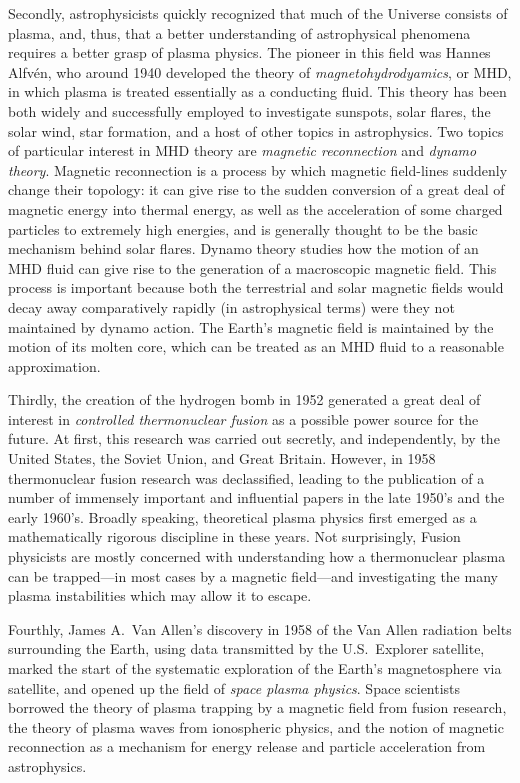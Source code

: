 Secondly, astrophysicists quickly 
recognized that much of the Universe consists of plasma,
and, thus, that a better understanding of astrophysical phenomena requires
a better grasp of plasma physics. The pioneer in this
field was Hannes Alfv\'{e}n, who around 1940 developed the theory of
{\em magnetohydrodyamics}, or MHD, in which plasma is treated essentially
 as a conducting
fluid. This theory has been both widely and successfully employed to
investigate sunspots, solar flares, the solar wind, star formation, and a
host of other topics in astrophysics. Two topics of particular
interest in MHD theory are {\em magnetic reconnection}\/ and
{\em dynamo theory}. Magnetic reconnection is a process by which magnetic field-lines
suddenly change their topology: it can give rise to the sudden
conversion of a great deal of magnetic energy into thermal energy, 
as well as the acceleration of some charged particles to extremely high energies,
and is
generally thought to be the basic  mechanism behind  solar flares. Dynamo theory
studies how the motion of an MHD fluid can give rise to the generation of
a macroscopic magnetic field. This process is important because
both the terrestrial and solar magnetic fields would decay away
comparatively rapidly (in astrophysical terms)
were they not maintained by dynamo action. The Earth's
magnetic field is maintained by the motion of its molten core, which can
be treated as an MHD fluid to a reasonable approximation. 

Thirdly, the creation of the hydrogen bomb in 1952  generated a great deal of
interest in {\em controlled thermonuclear fusion}\/ as a possible power
source for the future. At first, this research was carried out secretly,
and independently, by the United States, the Soviet Union, and Great Britain. 
However, in 1958 thermonuclear fusion research was declassified, leading to
the publication of a number of immensely important and influential papers in the late
1950's and the early 1960's. Broadly speaking, theoretical plasma physics
first emerged as a mathematically rigorous discipline in these years. 
Not surprisingly, Fusion physicists are mostly concerned with 
understanding how a thermonuclear plasma can be trapped---in most
cases by a magnetic field---and
investigating the many plasma instabilities which may allow it to escape. 

Fourthly,  James A.~Van Allen's discovery in 1958  of the Van Allen radiation belts 
surrounding the
Earth, using data transmitted by the  U.S.\ Explorer satellite,  marked the
start of the systematic exploration of the Earth's magnetosphere via
satellite, and opened up the field of {\em space plasma physics}. 
Space scientists borrowed the theory of plasma trapping by a magnetic
field from fusion research, the theory of plasma waves from ionospheric
physics, and the notion of magnetic reconnection as a mechanism for
energy release and particle acceleration from astrophysics. 

